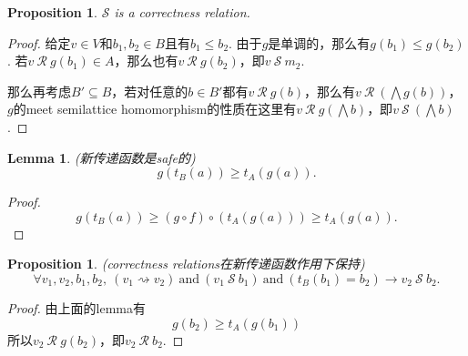 \documentclass{article}
\newtheorem{lemma}[theorem]{Lemma}
\newtheorem{proposition}[theorem]{Proposition}
\begin{document}
\begin{proposition}
\rm $\mathcal{S}$ is a correctness relation.
\end{proposition}

\begin{proof}
给定$v \in V$和$b_1,b_2 \in B$且有$b_1 \leq b_2$. 由于$g$是单调的，那么有$g(b_1) \leq g(b_2)$. 若$v~\mathcal{R}~g(b_1) \in A$，那么也有$v~\mathcal{R}~g(b_2)$，即$v~\mathcal{S}~m_2$.

那么再考虑$B' \subseteq B$，若对任意的$b \in B'$都有$v~\mathcal{R}~g(b)$，那么有$v ~\mathcal{R}~(\bigwedge g(b))$，$g$的meet semilattice homomorphism的性质在这里有$v~\mathcal{R}~g(\bigwedge b)$，即$v~\mathcal{S}~(\bigwedge b)$.
\end{proof}

\begin{lemma} \rm {\color{red}(新传递函数是safe的)}
$$
g(t_B(a)) \geq t_A(g(a)).
$$
\end{lemma}

\begin{proof}
$$
g(t_B(a)) \geq (g \circ f)\circ (t_A(g(a))) \geq t_A(g(a)).
$$
\end{proof}

\begin{proposition}
\rm {\color{red}(correctness relations在新传递函数作用下保持)}
$$
\forall v_1,v_2,b_1,b_2,~(v_1 \rightsquigarrow v_2)~\text{and}~(v_1 ~\mathcal{S}~b_1)~\text{and}~(t_B(b_1) = b_2) \rightarrow v_2~\mathcal{S}~ b_2.
$$
\end{proposition}

\begin{proof}
由上面的lemma有
$$
g(b_2) \geq t_A(g(b_1))
$$
所以$v_2~\mathcal{R}~g(b_2)$，即$v_2~\mathcal{R}~b_2$.
\end{proof}
\end{document}
